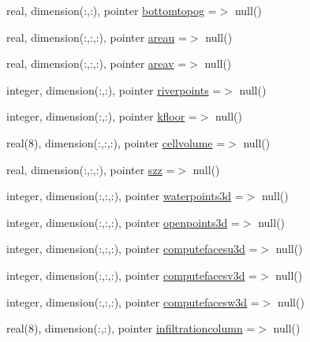 \begin{DoxyCompactItemize}
real, dimension(\+:,\+:), pointer \mbox{\hyperlink{structmoduleporousmedia_1_1t__extvar_abc8074a037948c13d1dd55859c0d2f78}{bottomtopog}} =$>$ null()
\item 
real, dimension(\+:,\+:,\+:), pointer \mbox{\hyperlink{structmoduleporousmedia_1_1t__extvar_a9132562c27cf3bc1fcdc7142e0a9c24c}{areau}} =$>$ null()
\item 
real, dimension(\+:,\+:,\+:), pointer \mbox{\hyperlink{structmoduleporousmedia_1_1t__extvar_ad36535c4c6d98e6da140df74170fe4f5}{areav}} =$>$ null()
\item 
integer, dimension(\+:,\+:), pointer \mbox{\hyperlink{structmoduleporousmedia_1_1t__extvar_aebd63ee6544a31aa100224f8e1886086}{riverpoints}} =$>$ null()
\item 
integer, dimension(\+:,\+:), pointer \mbox{\hyperlink{structmoduleporousmedia_1_1t__extvar_aa14197d60d51f2099a88a9a43d29b08a}{kfloor}} =$>$ null()
\item 
real(8), dimension(\+:,\+:,\+:), pointer \mbox{\hyperlink{structmoduleporousmedia_1_1t__extvar_a95e9bd89a73e3cd2e12eb5876abd4ece}{cellvolume}} =$>$ null()
\item 
real, dimension(\+:,\+:,\+:), pointer \mbox{\hyperlink{structmoduleporousmedia_1_1t__extvar_a9b6583fb3504708b65f02ab5fb128fcc}{szz}} =$>$ null()
\item 
integer, dimension(\+:,\+:,\+:), pointer \mbox{\hyperlink{structmoduleporousmedia_1_1t__extvar_a5d1c62dafa982b24d1149abac4235d0a}{waterpoints3d}} =$>$ null()
\item 
integer, dimension(\+:,\+:,\+:), pointer \mbox{\hyperlink{structmoduleporousmedia_1_1t__extvar_abacc9d48087308b5b9b54c7f81fc0279}{openpoints3d}} =$>$ null()
\item 
integer, dimension(\+:,\+:,\+:), pointer \mbox{\hyperlink{structmoduleporousmedia_1_1t__extvar_a378700b6d33eb3b6cbf3917235d64bf2}{computefacesu3d}} =$>$ null()
\item 
integer, dimension(\+:,\+:,\+:), pointer \mbox{\hyperlink{structmoduleporousmedia_1_1t__extvar_ab6cb0e930421c6e2b4835c95602e1abc}{computefacesv3d}} =$>$ null()
\item 
integer, dimension(\+:,\+:,\+:), pointer \mbox{\hyperlink{structmoduleporousmedia_1_1t__extvar_af8a5ccf1ccf64216f37ba5c45a9045d3}{computefacesw3d}} =$>$ null()
\item 
real(8), dimension(\+:,\+:), pointer \mbox{\hyperlink{structmoduleporousmedia_1_1t__extvar_a016ec0be2df4b5c18cf0622db1d9b25c}{infiltrationcolumn}} =$>$ null()
\item 

\end{DoxyCompactItemize}
